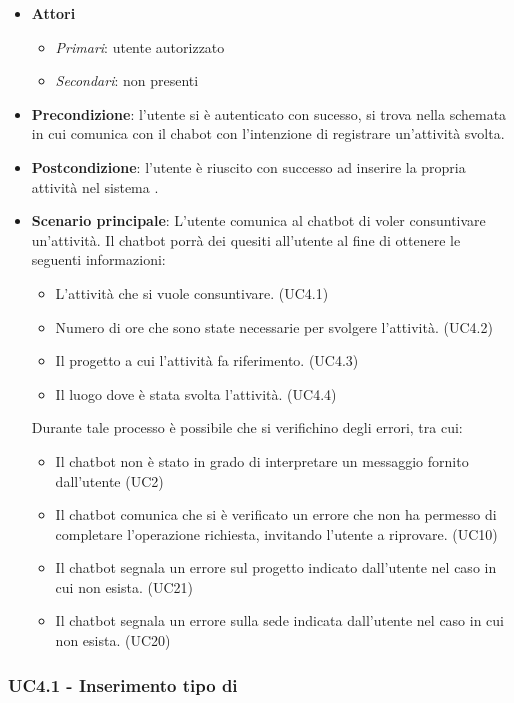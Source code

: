 \begin{itemize}
    \item \textbf{Attori}
    \begin{itemize} 
        \item \textit{Primari}: utente autorizzato
        \item \textit{Secondari}: non presenti
    \end{itemize}
 \item \textbf{Precondizione}: l'utente si è autenticato con sucesso, si trova nella schemata in cui comunica con il chabot con l'intenzione di registrare un'attività svolta. 
 \item \textbf{Postcondizione}: l'utente è riuscito con successo ad inserire la propria attività nel sistema .  
 \item \textbf{Scenario principale}: L'utente comunica al chatbot di voler consuntivare un'attività. Il chatbot porrà dei quesiti all'utente al fine di ottenere le seguenti informazioni: 
    \begin{itemize}
        \item L'attività che si vuole consuntivare. (UC4.1)
        \item Numero di ore che sono state necessarie per svolgere l'attività. (UC4.2)
        \item Il progetto a cui l'attività fa riferimento. (UC4.3)
        \item Il luogo dove è stata svolta l'attività. (UC4.4)
    \end{itemize}
 Durante tale processo è possibile che si verifichino degli errori, tra cui: 
    \begin{itemize}
        \item Il chatbot non è stato in grado di interpretare un messaggio fornito dall'utente (UC2)
        \item Il chatbot comunica che si è verificato un errore che non ha permesso di completare l'operazione richiesta, invitando l'utente a riprovare. (UC10)
        \item Il chatbot segnala un errore sul progetto indicato dall'utente nel caso in cui non esista. (UC21)
        \item Il chatbot segnala un errore sulla sede indicata dall'utente nel caso in cui non esista. (UC20)
    \end{itemize}
\end{itemize}

\newpage

\subsubsection{UC4.1 - Inserimento tipo di }

